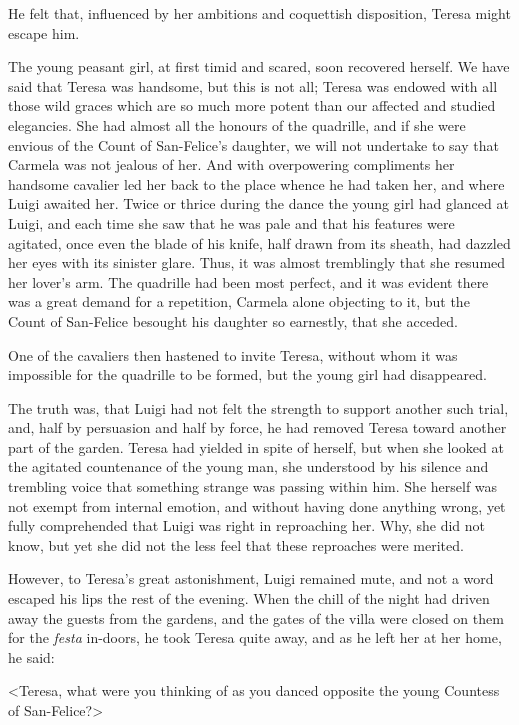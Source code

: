 {He felt that, influenced by her ambitions and coquettish disposition, Teresa might escape him. 

The young peasant girl, at first timid and scared, soon recovered herself. We have said that Teresa was handsome, but this is not all; Teresa was endowed with all those wild graces which are so much more potent than our affected and studied elegancies. She had almost all the honours of the quadrille, and if she were envious of the Count of San-Felice's daughter, we will not undertake to say that Carmela was not jealous of her. And with overpowering compliments her handsome cavalier led her back to the place whence he had taken her, and where Luigi awaited her. Twice or thrice during the dance the young girl had glanced at Luigi, and each time she saw that he was pale and that his features were agitated, once even the blade of his knife, half drawn from its sheath, had dazzled her eyes with its sinister glare. Thus, it was almost tremblingly that she resumed her lover's arm. The quadrille had been most perfect, and it was evident there was a great demand for a repetition, Carmela alone objecting to it, but the Count of San-Felice besought his daughter so earnestly, that she acceded. 

One of the cavaliers then hastened to invite Teresa, without whom it was impossible for the quadrille to be formed, but the young girl had disappeared. 

The truth was, that Luigi had not felt the strength to support another such trial, and, half by persuasion and half by force, he had removed Teresa toward another part of the garden. Teresa had yielded in spite of herself, but when she looked at the agitated countenance of the young man, she understood by his silence and trembling voice that something strange was passing within him. She herself was not exempt from internal emotion, and without having done anything wrong, yet fully comprehended that Luigi was right in reproaching her. Why, she did not know, but yet she did not the less feel that these reproaches were merited. 

However, to Teresa's great astonishment, Luigi remained mute, and not a word escaped his lips the rest of the evening. When the chill of the night had driven away the guests from the gardens, and the gates of the villa were closed on them for the \textit{festa} in-doors, he took Teresa quite away, and as he left her at her home, he said: 

<Teresa, what were you thinking of as you danced opposite the young Countess of San-Felice?> 

}
